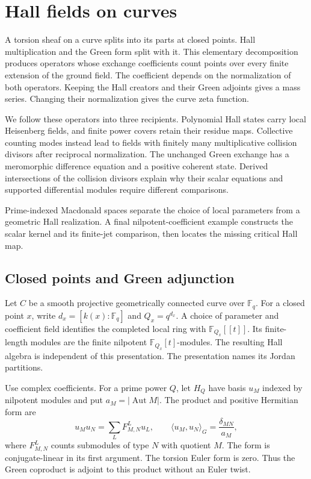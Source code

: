 \chapter{Hall fields on curves}
\label{v4-arith:curve:chapter}

A torsion sheaf on a curve splits into its parts at closed points.
Hall multiplication and the Green form split with it. This elementary
decomposition produces operators whose exchange coefficients count
points over every finite extension of the ground field. The coefficient
depends on the normalization of both operators. Keeping the Hall
creators and their Green adjoints gives a mass series. Changing their
normalization gives the curve zeta function.

We follow these operators into three recipients. Polynomial Hall
states carry local Heisenberg fields, and finite power covers retain
their residue maps. Collective counting modes instead lead to fields
with finitely many multiplicative collision divisors after reciprocal
normalization. The unchanged Green exchange has a meromorphic
difference equation and a positive coherent state. Derived intersections
of the collision divisors explain why their scalar equations and
supported differential modules require different comparisons.

Prime-indexed Macdonald spaces separate the choice of local parameters
from a geometric Hall realization. A final nilpotent-coefficient
example constructs the scalar kernel and its finite-jet comparison,
then locates the missing critical Hall map.

\section{Closed points and Green adjunction}
\label{v4-arith:curve:sec:green}

Let $C$ be a smooth projective geometrically connected curve over
$\mathbb F_q$. For a closed point $x$, write
$d_x=[k(x):\mathbb F_q]$ and $Q_x=q^{d_x}$.
A choice of parameter and coefficient field identifies the completed
local ring with $\mathbb F_{Q_x}[[t]]$. Its finite-length modules
are the finite nilpotent $\mathbb F_{Q_x}[t]$-modules.
The resulting Hall algebra is independent of this presentation.
The presentation names its Jordan partitions.

Use complex coefficients. For a prime power $Q$, let $H_Q$ have basis
$u_M$ indexed by nilpotent modules and put
$a_M=|\operatorname{Aut}M|$. The product and positive Hermitian form are
\[
 u_Mu_N=\sum_L F^L_{M,N}u_L,
 \qquad \langle u_M,u_N\rangle_G=\frac{\delta_{MN}}{a_M},
\]
where $F^L_{M,N}$ counts submodules of type $N$ with quotient $M$.
The form is conjugate-linear in its first argument.
The torsion Euler form is zero. Thus the Green coproduct is adjoint
to this product without an Euler twist.

